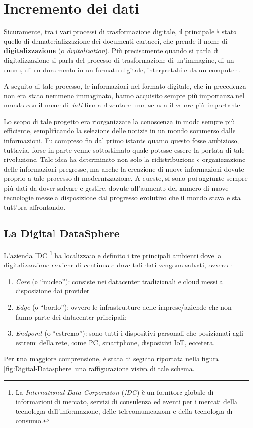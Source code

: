 \section{Incremento dei dati}

Sicuramente, tra i vari processi di trasformazione digitale, il principale è stato quello di dematerializzazione dei documenti cartacei, che prende il nome di \textbf{digitalizzazione} (o \textit{digitalization}). Più precisamente quando si parla di digitalizzazione si parla del processo di trasformazione di un'immagine, di un suono, di un documento in un formato digitale, interpretabile da un computer \cite{wikipedia_digitalization_definition}.

A seguito di tale processo, le informazioni nel formato digitale, che in precedenza non era stato nemmeno immaginato, hanno acquisito sempre più importanza nel mondo con il nome di \textit{dati} fino a diventare uno, se non il valore più importante.

Lo scopo di tale progetto era riorganizzare la conoscenza in modo sempre più efficiente, semplificando la selezione delle notizie in un mondo sommerso dalle informazioni. Fu compreso fin dal primo istante quanto questo fosse ambizioso, tuttavia, forse in parte venne sottostimato quale potesse essere la portata di tale rivoluzione. Tale idea ha determinato non solo la ridistribuzione e organizzazione delle informazioni pregresse, ma anche la creazione di nuove informazioni dovute proprio a tale processo di modernizzazione. A queste, si sono poi aggiunte sempre più dati da dover salvare e gestire, dovute all'aumento del numero di nuove tecnologie messe a disposizione dal progresso evolutivo che il mondo stava e sta tutt'ora affrontando. 

\subsection{La Digital DataSphere}

L'azienda IDC \footnote{La \textit{International Data Corporation} (\textit{IDC}) è un fornitore globale di informazioni di mercato, servizi di consulenza ed eventi per i mercati della tecnologia dell'informazione, delle telecomunicazioni e della tecnologia di consumo.} ha localizzato e definito i tre principali ambienti dove la digitalizzazione avviene di continuo e dove tali dati vengono salvati, ovvero \cite{idc_digital_datasphere}:

\begin{enumerate}
    \item \textit{Core} (o “nucleo”): consiste nei datacenter tradizionali e cloud messi a disposizione dai provider;
    \item \textit{Edge} (o “bordo”): ovvero le infrastrutture delle imprese/aziende che non fanno parte dei datacenter principali; 
    \item \textit{Endpoint} (o “estremo”): sono tutti i dispositivi personali che posizionati agli estremi della rete, come PC, smartphone, dispositivi IoT, eccetera. 
\end{enumerate}
Per una maggiore comprensione, è stata di seguito riportata nella figura \ref{fig:Digital-Datasphere} una raffigurazione visiva di tale schema.

